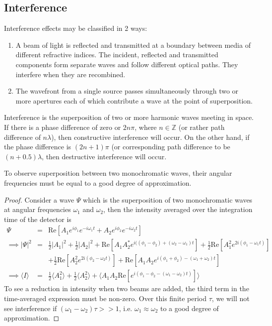 \documentclass[a4paper]{article}
\begin{document}
\subsection{Interference}
\begin{defi}[Interference]
Interference effects may be classified in 2 ways:
\begin{enumerate}[label=(\roman*)]
    \item A beam of light is reflected and transmitted at a boundary between media of different refractive indices. The incident, reflected and transmitted components form separate waves and follow different optical paths. They interfere when they are recombined.
    \item The wavefront from a single source passes simultaneously through two or more apertures each of which contribute a wave at the point of superposition.
\end{enumerate}
\end{defi}
\begin{defi}
Interference is the superposition of two or more harmonic waves meeting in space. If there is a phase difference of zero or $2n\pi$, where $n\in\mathbb{Z}$ (or rather path difference of $n\lambda$), then constructive interference will occur. On the other hand, if the phase difference is $(2n+1)\pi$ (or corresponding path difference to be $(n+0.5)\lambda$, then destructive interference will occur.
\end{defi}
\begin{thm}
To observe superposition between two monochromatic waves, their angular frequencies must be equal to a good degree of approximation.
\end{thm}
\begin{proof}
Consider a wave $\Psi$ which is the superposition of two monochromatic waves at angular frequencies $\omega_1$ and $\omega_2$, then the intensity averaged over the integration time of the detector is
\begin{eqnarray}
\Psi&=&\text{Re}[A_1e^{i\phi_1}e^{-i\omega_1t}+A_2e^{i\phi_2}e^{-i\omega_2t}]\nonumber\\\implies|\Psi|^2&=&\frac{1}{2}|A_1|^2+\frac{1}{2}|A_2|^2+\text{Re}[A_1A_2^*e^{i((\phi_1-\phi_2)+(\omega_2-\omega_1)t}]+\frac{1}{2}\text{Re}[A_1^2e^{2i(\phi_1-\omega_1t)}]\nonumber\\&&+\frac{1}{2}\text{Re}[A_2^2e^{2i(\phi_2-\omega_2t)}]+\text{Re}[A_1A_2e^{i(\phi_1+\phi_2)-(\omega_1+\omega_2)t}]\nonumber\\\implies \langle I\rangle&=&\frac{1}{2}\langle A_1^2\rangle+\frac{1}{2}\langle A_2^2\rangle+\langle A_1A_2\text{Re}[e^{i(\phi_1-\phi_2-(\omega_1-\omega_2)t)}]\rangle\nonumber
\end{eqnarray}
To see a reduction in intensity when two beams are added, the third term in the time-averaged expression must be non-zero. Over this finite period $\tau$, we will not see interference if $(\omega_1-\omega_2)\tau>>1$, i.e. $\omega_1\approx\omega_2$ to a good degree of approximation.
\end{proof}
\end{document}
